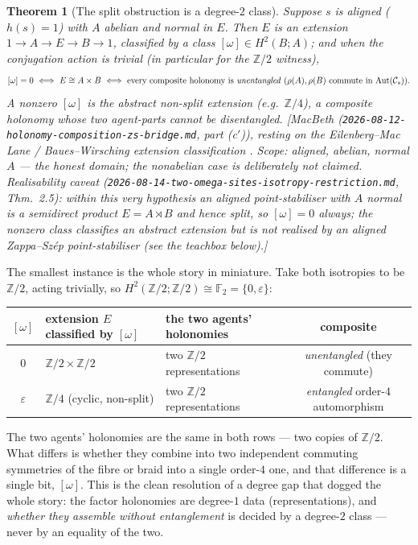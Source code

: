 \documentclass[11pt,a4paper]{book}
\theoremstyle{plain}
\newtheorem{Theorem}{Theorem}[chapter]
\theoremstyle{definition}
\theoremstyle{remark}
\newcommand{\prov}[1]{\hfill\textsf{\footnotesize[#1]}}
\begin{document}
\begin{Theorem}[The split obstruction is a degree-$2$ class]\label{thm:emergent-h2}
Suppose $s$ is aligned ($h(s)=1$) with $A$ abelian and normal in $E$. Then $E$ is an
extension $1\to A\to E\to B\to 1$, classified by a class $[\omega]\in H^{2}(B;A)$; and
when the conjugation action is trivial (in particular for the $\mathbb Z/2$ witness),
\[
   [\omega]=0
   \ \Longleftrightarrow\ E\cong A\times B
   \ \Longleftrightarrow\
   \text{every composite holonomy is \emph{unentangled}}
   \ (\rho(A),\rho(B)\text{ commute in }\mathrm{Aut}(\mathcal C_{s})).
\]
A nonzero $[\omega]$ is the \emph{abstract} non-split extension (e.g.\ $\mathbb Z/4$), a
composite holonomy whose two agent-parts cannot be disentangled.
\prov{MacBeth (\texttt{2026-08-12-holonomy-composition-zs-bridge.md}, part (c$'$)),
resting on the Eilenberg--Mac Lane / Baues--Wirsching extension classification
\cite{BW85}. Scope: aligned, abelian, normal $A$ --- the honest domain; the nonabelian
case is deliberately not claimed. \emph{Realisability caveat}
(\texttt{2026-08-14-two-omega-sites-isotropy-restriction.md}, Thm.~2.5): within this very
hypothesis an aligned point-stabiliser with $A$ normal is a semidirect product
$E=A\rtimes B$ and hence \emph{split}, so $[\omega]=0$ always; the nonzero class classifies
an abstract extension but is not realised by an aligned Zappa--Sz\'ep point-stabiliser
(see the teachbox below).}
\end{Theorem}

The smallest instance is the whole story in miniature. Take both isotropies to be
$\mathbb Z/2$, acting trivially, so $H^{2}(\mathbb Z/2;\mathbb Z/2)\cong\mathbb F_{2}=
\{0,\varepsilon\}$:
\begin{center}
\renewcommand{\arraystretch}{1.3}
\begin{tabular}{@{}cllc@{}}
\toprule
$[\omega]$ & extension $E$ classified by $[\omega]$ & the two agents' holonomies & composite\\
\midrule
$0$ & $\mathbb Z/2\times\mathbb Z/2$ & two $\mathbb Z/2$ representations & \emph{unentangled} (they commute)\\
$\varepsilon$ & $\mathbb Z/4$ (cyclic, non-split) & two $\mathbb Z/2$ representations & \emph{entangled} order-$4$ automorphism\\
\bottomrule
\end{tabular}
\end{center}
The two agents' holonomies are the same in both rows --- two copies of $\mathbb Z/2$.
What differs is whether they combine into two independent commuting symmetries of the
fibre or braid into a single order-$4$ one, and that difference is a single bit,
$[\omega]$. This is the clean resolution of a degree gap that dogged the whole story: the
factor holonomies are degree-$1$ data (representations), and \emph{whether they assemble
without entanglement} is decided by a degree-$2$ class --- never by an equality of the
two.
\end{document}
